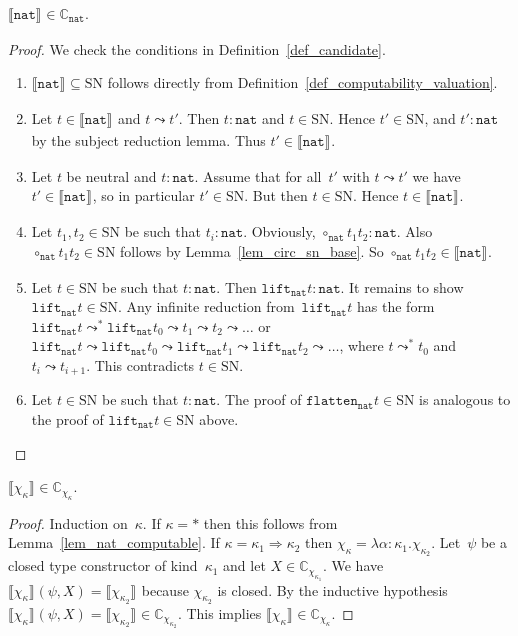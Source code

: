 \documentclass[a4paper,UKenglish,cleveref,autoref,numberwithinsect]{lipics-v2019}
\theoremstyle{definition}
\newcommand{\arrkind}{\Rightarrow}
\newcommand{\arrW}{\leadsto}
\newcommand{\nat}{\mathtt{nat}}
\newcommand{\flatten}{\mathtt{flatten}}
\newcommand{\lift}{\mathtt{lift}}
\newcommand{\SN}{\mathrm{SN}}
\newcommand{\Cb}{\mathbb{C}}
\newcommand{\val}[3]{\ensuremath{\llbracket#1\rrbracket_{#2}^{#3}}}
\begin{document}
\begin{lemma}\label{lem_nat_computable}
  $\val{\nat}{}{} \in \Cb_{\nat}$.
\end{lemma}

\begin{proof}
  We check the conditions in Definition~\ref{def_candidate}.
  \begin{enumerate}
  \item $\val{\nat}{}{} \subseteq \SN$ follows
    directly from Definition~\ref{def_computability_valuation}.
  \item Let $t \in \val{\nat}{}{}$ and $t \arrW t'$. Then $t :
    \nat$ and $t \in \SN$. Hence $t' \in \SN$, and $t' : \nat$ by the
    subject reduction lemma. Thus $t' \in \val{\nat}{}{}$.
  \item Let $t$ be neutral and $t : \nat$. Assume that for all~$t'$
    with $t \arrW t'$ we have $t' \in \val{\nat}{}{}$, so in
    particular $t' \in \SN$. But then $t \in \SN$. Hence $t \in
    \val{\nat}{}{}$.
  \item Let $t_1,t_2 \in \SN$ be such that $t_i : \nat$. Obviously,
    $\circ_\nat t_1 t_2 : \nat$. Also $\circ_\nat t_1 t_2 \in \SN$
    follows by Lemma~\ref{lem_circ_sn_base}. So $\circ_\nat t_1 t_2
    \in \val{\nat}{}{}$.
  \item Let $t \in \SN$ be such that $t : \nat$. Then $\lift_\nat t :
    \nat$. It remains to show $\lift_\nat t \in \SN$. Any infinite
    reduction from~$\lift_\nat t$ has the form $\lift_\nat t
    \arrW^* \lift_\nat t_0 \arrW t_1 \arrW t_2 \arrW
    \ldots$ or $\lift_\nat t \arrW \lift_\nat t_0 \arrW
    \lift_\nat t_1 \arrW \lift_\nat t_2 \arrW \ldots$, where $t
    \arrW^* t_0$ and $t_i \arrW t_{i+1}$. This contradicts $t
    \in \SN$.
  \item Let $t \in \SN$ be such that $t : \nat$. The proof of
    $\flatten_\nat t \in \SN$ is analogous to the proof of $\lift_\nat
    t \in \SN$ above.\qedhere
  \end{enumerate}
\end{proof}

\begin{lemma}\label{lem_chi_kappa_computable}
  $\val{\chi_\kappa}{}{} \in \Cb_{\chi_\kappa}$.
\end{lemma}

\begin{proof}
  Induction on~$\kappa$. If $\kappa = *$ then this follows from
  Lemma~\ref{lem_nat_computable}. If $\kappa=\kappa_1\arrkind\kappa_2$
  then $\chi_\kappa = \lambda \alpha : \kappa_1
  . \chi_{\kappa_2}$. Let~$\psi$ be a closed type constructor of
  kind~$\kappa_1$ and let $X \in \Cb_{\chi_{\kappa_1}}$. We have
  $\val{\chi_\kappa}{}{}(\psi,X) = \val{\chi_{\kappa_2}}{}{}$ because
  $\chi_{\kappa_2}$ is closed. By the inductive hypothesis
  $\val{\chi_\kappa}{}{}(\psi,X) = \val{\chi_{\kappa_2}}{}{} \in
  \Cb_{\chi_{\kappa_2}}$. This implies $\val{\chi_\kappa}{}{} \in
  \Cb_{\chi_\kappa}$.
\end{proof}
\end{document}
